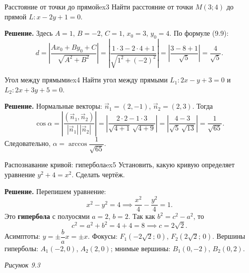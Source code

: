 \documentclass[12pt,a4paper]{article}
\begin{document}
\begin{exampleBox}{Расстояние от точки до прямой}{ex3}
  Найти расстояние от точки $M(3; 4)$ до прямой $L: x - 2y + 1 = 0$.

  \textbf{Решение.} Здесь $A = 1$, $B = -2$, $C = 1$, $x_0 = 3$,
  $y_0 = 4$. По формуле (9.9):
  \[
    d = \left| \frac{Ax_0 + By_0 + C}{\sqrt{A^2 + B^2}} \right|
    = \left| \frac{1\cdot 3 - 2\cdot 4 + 1}{\sqrt{1^2 + (-2)^2}} \right|
    = \left| \frac{3 - 8 + 1}{\sqrt{5}} \right|
    = \frac{4}{\sqrt{5}}.
  \]
\end{exampleBox}

\begin{exampleBox}{Угол между прямыми}{ex4}
  Найти угол между прямыми $L_1: 2x - y + 3 = 0$ и
  $L_2: 2x + 3y + 5 = 0$.

  \textbf{Решение.} Нормальные векторы: $\vec{n}_1 = (2, -1)$,
  $\vec{n}_2 = (2, 3)$. Тогда
  \[
    \cos\alpha = \left| \frac{(\vec{n}_1, \vec{n}_2)}
    {|\vec{n}_1|\,|\vec{n}_2|} \right|
    = \left| \frac{2\cdot 2 - 1\cdot 3}{\sqrt{4 + 1}\,\sqrt{4 + 9}}
    \right|
    = \left| \frac{4 - 3}{\sqrt{5}\,\sqrt{13}} \right|
    = \frac{1}{\sqrt{65}}.
  \]
  Следовательно, $\alpha = \arccos\dfrac{1}{\sqrt{65}}$.
\end{exampleBox}

\begin{exampleBox}{Распознавание кривой: гипербола}{ex5}
  Установить, какую кривую определяет уравнение $y^2 + 4 = x^2$. Сделать
  чертёж.

  \textbf{Решение.} Перепишем уравнение:
  \[
    x^2 - y^2 = 4 \implies \frac{x^2}{4} - \frac{y^2}{4} = 1.
  \]
  Это \textbf{гипербола} с полуосями $a = 2$, $b = 2$. Так как
  $b^2 = c^2 - a^2$, то
  \[
    c^2 = a^2 + b^2 = 4 + 4 = 8 \implies c = 2\sqrt{2}.
  \]
  Асимптоты: $y = \pm\dfrac{b}{a}x = \pm x$. Фокусы:
  $F_1(-2\sqrt{2};\, 0)$, $F_2(2\sqrt{2};\, 0)$. Вершины гиперболы:
  $A_1(-2, 0)$, $A_2(2, 0)$; мнимые вершины: $B_1(0, -2)$, $B_2(0, 2)$.

  \begin{center}

    \textit{Рисунок 9.3}
  \end{center}
\end{exampleBox}
\end{document}
